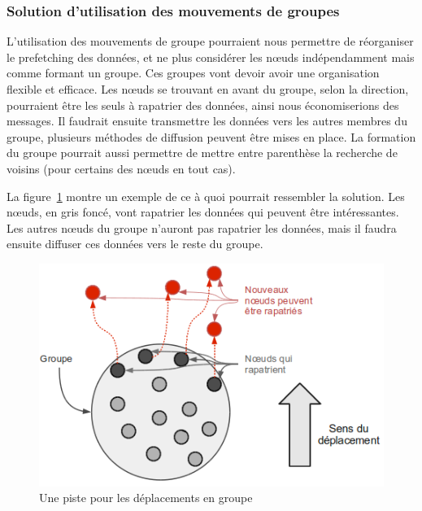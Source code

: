 \subsubsection{Solution d'utilisation des mouvements de groupes}
\par L'utilisation des mouvements de groupe pourraient nous permettre de réorganiser le prefetching des données, et ne plus considérer les nœuds indépendamment mais comme formant un groupe. Ces groupes vont devoir avoir une organisation flexible et efficace. Les nœuds se trouvant en avant du groupe, selon la direction, pourraient être les seuls à rapatrier des données, ainsi nous économiserions des messages. Il faudrait ensuite transmettre les données vers les autres membres du groupe, plusieurs méthodes de diffusion peuvent être mises en place. La formation du groupe pourrait aussi permettre de mettre entre parenthèse la recherche de voisins (pour certains des nœuds en tout cas). 
\par La figure~\ref{mouvgroup} montre un exemple de ce à quoi pourrait ressembler la solution. Les nœuds, en gris foncé, vont rapatrier les données qui peuvent être intéressantes. Les autres nœuds du groupe n'auront pas rapatrier les données, mais il faudra ensuite diffuser ces données vers le reste du groupe.

	\vspace{1cm}
        \begin{figure}[!h]
        \centering
        \includegraphics[scale=0.65]{./Ressources/Images/mouvgroup.png}
        \caption{Une piste pour les déplacements en groupe}
        \label{mouvgroup}
        \end{figure}

\newpage
 
